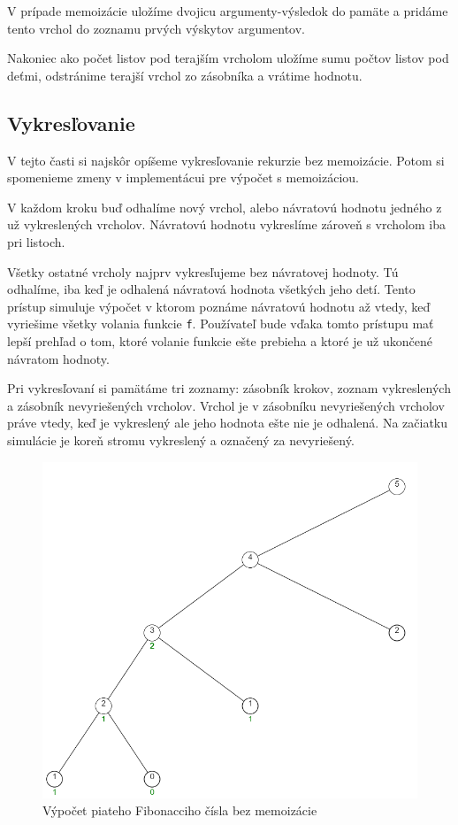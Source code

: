 V prípade memoizácie uložíme dvojicu argumenty-výsledok do
pamäte a pridáme tento vrchol do zoznamu prvých výskytov argumentov.

Nakoniec ako počet listov pod terajším vrcholom uložíme sumu počtov listov pod deťmi,
odstránime terajší vrchol zo zásobníka a vrátime hodnotu.

\subsection{Vykresľovanie}
V tejto časti si najskôr opíšeme vykresľovanie rekurzie bez memoizácie. Potom
si spomenieme zmeny v implementácui pre výpočet s
memoizáciou.

V každom kroku buď odhalíme nový vrchol, alebo návratovú hodnotu jedného
z už vykreslených vrcholov. Návratovú hodnotu vykreslíme zároveň s vrcholom iba pri listoch.

Všetky ostatné vrcholy najprv vykresľujeme bez návratovej hodnoty. Tú odhalíme, iba keď
je odhalená návratová hodnota všetkých jeho detí. Tento prístup simuluje výpočet v ktorom
poznáme návratovú hodnotu až vtedy, keď vyriešime všetky volania funkcie \lstinline[language=Javascript]{f}.
Používateľ bude vďaka tomto prístupu mať lepší prehľad o tom, ktoré volanie funkcie ešte prebieha
a ktoré je už ukončené návratom hodnoty.

Pri vykresľovaní si pamätáme tri zoznamy: zásobník krokov, zoznam vykreslených a zásobník
nevyriešených vrcholov. Vrchol je v zásobníku nevyriešených vrcholov práve vtedy,
keď je vykreslený ale jeho hodnota ešte nie je odhalená. Na začiatku simulácie je
koreň stromu vykreslený a označený za nevyriešený.

\begin{figure}[h]
\includegraphics[width=\textwidth,height=\textheight,keepaspectratio]{images/bezMemo.png}
\caption{Výpočet piateho Fibonacciho čísla bez memoizácie}
\label{obr:memo}
\end{figure}

